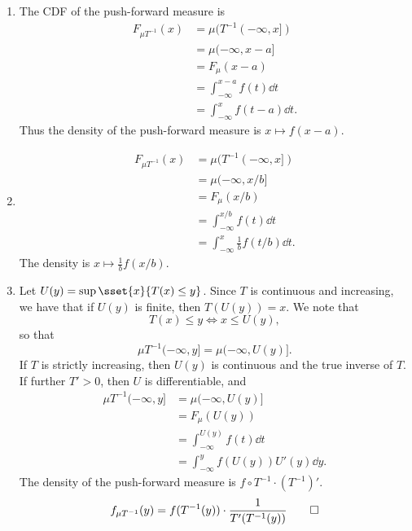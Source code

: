 \documentclass[12pt]{article}
\begin{document}
\begin{solution} \leavevmode
    \begin{enumerate}
        \item The CDF of the push-forward measure is \begin{align*}
            F_{\mu T^{-1}}(x) &= \mu(T^{-1}(-\infty, x]) \\
                &= \mu(-\infty, x - a] \\
                &= F_\mu(x - a) \\
                &= \int_{-\infty}^{x - a} f(t) \dd t \\
                &= \int_{-\infty}^x f(t - a) \dd t.
        \end{align*} Thus the density of the push-forward measure is
        $x \mapsto f(x - a)$.
        \item \begin{align*}
            F_{\mu T^{-1}}(x) &= \mu(T^{-1}(-\infty, x]) \\
                &= \mu(-\infty, x/b] \\
                &= F_\mu(x/b) \\
                &= \int_{-\infty}^{x/b} f(t) \dd t \\
                &= \int_{-\infty}^x \frac1b f(t/b) \dd t.
        \end{align*}
        The density is $x \mapsto \frac1b f(x/b)$.
        \item Let $U(y) = \sup\sset{x}{T(x) \le y}$.
        Since $T$ is continuous and increasing, we have that if $U(y)$ is
        finite, then $T(U(y)) = x$.
        We note that \[
            T(x) \le y \iff x \le U(y),
        \] so that \[
            \mu T^{-1} (-\infty, y] = \mu (-\infty, U(y)].
        \]
        If $T$ is strictly increasing, then $U(y)$ is continuous and the
        true inverse of $T$.
        If further $T' > 0$, then $U$ is differentiable, and \begin{align*}
            \mu T^{-1} (-\infty, y] &= \mu (-\infty, U(y)] \\
                &= F_\mu(U(y)) \\
                &= \int_{-\infty}^{U(y)} f(t) \dd t \\
                &= \int_{-\infty}^y f(U(y)) U'(y) \dd y.
        \end{align*}
        The density of the push-forward measure is
        $f \circ T^{-1} \cdot (T^{-1})'$. \[
            f_{\mu T^{-1}}(y) = f(T^{-1}(y)) \cdot \frac1{T'(T^{-1}(y))}
                \qedhere
        \]
    \end{enumerate}
\end{solution}
\end{document}
